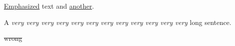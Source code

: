 \documentclass{article}
\begin{document}
\uline{Emphasized} text and \uline{another}.

A \emph{very very very very very very very
very very very very very} long sentence.

\qquad {}\qquad
\sout{wrong}\qquad {}\qquad
{}\qquad {}
\end{document}
